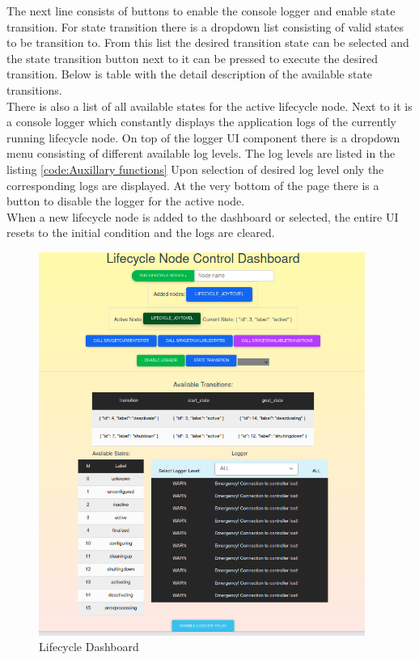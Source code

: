 The next line consists of buttons to enable the console logger and enable state transition. For state transition there is a dropdown list consisting of valid states to be transition to. From this list the desired transition state can be selected and the state transition button next to it can be pressed to execute the desired transition. Below is table with the detail description of the available state transitions. 
\\

There is also a list of all available states for the active lifecycle node. Next to it is a console logger which constantly displays the application logs of the currently running lifecycle node. On top of the logger UI component there is a dropdown menu consisting of different available log levels. The log levels are listed in the listing \ref{code:Auxillary functions} Upon selection of desired log level only the corresponding logs are displayed. At the very bottom of the page there is a button to disable the logger for the active node.
\\

When a new lifecycle node is added to the dashboard or selected, the entire UI resets to the initial condition and the logs are cleared.
\begin{figure}[H]
	\centering
	\includegraphics[width=0.95\textwidth]{"Bilder/lifecycle-dashboard.png"}
	\caption{Lifecycle Dashboard}
	\label{fig:Implementation:LifecycleDashboard}					
\end{figure}

